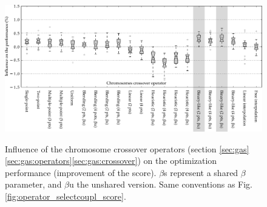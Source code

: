 \documentclass{ametsoc}
\begin{document}
\begin{figure}[t]
	\begin{center}
		\noindent\includegraphics[width=39pc,angle=0]{fig06.pdf}\\
	\end{center}
	\caption{Influence of the chromosome crossover operators (section \ref{sec:gas}\ref{sec:gas:operators}\ref{sec:gas:crossover}) on the optimization performance (improvement of the score).  $\beta$s represent a shared $\beta$ parameter, and $\beta$u the unshared version. Same conventions as Fig. \ref{fig:operator_selectcoupl_score}.}
	\label{fig:operator_crossover_score}
\end{figure}
\end{document}
